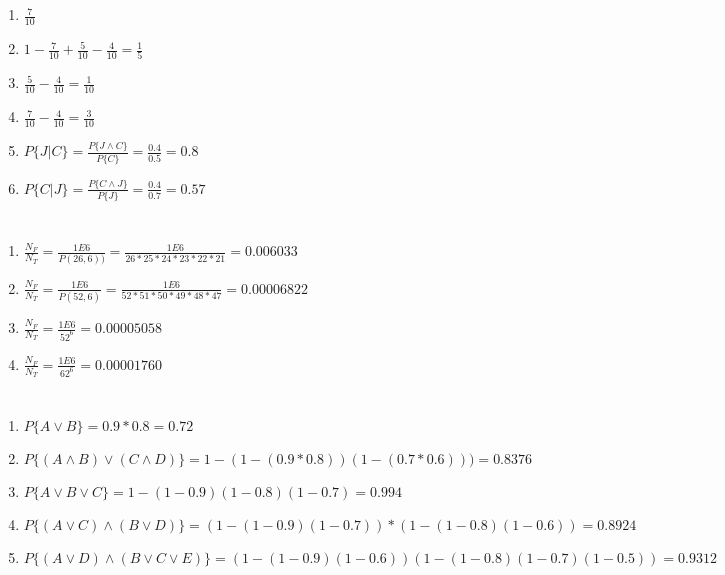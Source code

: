 \documentclass{article}
\begin{document}
\section{}
\begin{enumerate}
	\item \(\frac{7}{10}\)
	\item \(1-\frac{7}{10}+\frac{5}{10}-\frac{4}{10} = \frac{1}{5} \)
	\item \( \frac{5}{10} - \frac{4}{10} = \frac{1}{10}\)
	\item \(\frac{7}{10}-\frac{4}{10}=\frac{3}{10} \)
	\item \(P\{J|C\} = \frac{P\{J\land C\}}{P\{C\}} = \frac{0.4}{0.5} = 0.8 \)
	\item \(P\{C|J\}=\frac{P\{C\land J\}}{P\{J\}} = \frac{0.4}{0.7} = 0.57 \)
\end{enumerate}

\section{}
\begin{enumerate}
	\item \( \frac{N_F}{N_T} = \frac{1E6}{P\left(26,6\right))} = \frac{1E6}{26*25*24*23*22*21} = 0.006033 \)
	\item \( \frac{N_F}{N_T} = \frac{1E6}{P\left(52,6\right)} = \frac{1E6}{52*51*50*49*48*47} = 0.00006822 \)
	\item \( \frac{N_F}{N_T} = \frac{1E6}{52^6} = 0.00005058 \)
	\item \( \frac{N_F}{N_T} = \frac{1E6}{62^6} = 0.00001760 \)
\end{enumerate}

\section{}
\begin{enumerate}
	\item \( P\{A \lor B\} = 0.9 *0.8 = 0.72 \)
	\item \( P\{\left(A \land B\right) \lor \left(C \land D\right) \} = 1 - (1-(0.9*0.8))(1-(0.7*0.6)))  = 0.8376 \)
	\item \( P\{A \lor B \lor C \} = 1-(1-0.9)(1-0.8)(1-0.7) = 0.994 \)
	\item \( P\{(A \lor C) \land (B \lor D) \} = (1-(1-0.9)(1-0.7))*(1-(1-0.8)(1-0.6)) = 0.8924 \)
	\item \( P\{(A \lor D) \land (B \lor C \lor E) \} = (1-(1-0.9)(1-0.6))(1-(1-0.8)(1-0.7)(1-0.5)) = 0.9312 \)
	
\end{enumerate}
\end{document}

